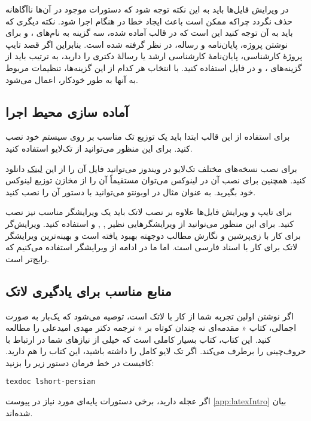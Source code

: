 در ویرایش فایل‌ها باید به این نکته توجه شود که دستورات موجود در آن‌ها ناآگاهانه حذف نگردد چراکه ممکن است باعث ایجاد خطا در هنگام اجرا شود.
نکته دیگری که باید به آن توجه کنید این است که در قالب آماده شده، سه گزینه به نام‌های
،
و
برای نوشتن پروژه، پایان‌نامه و رساله، در نظر گرفته شده است. بنابراین اگر قصد تایپ پروژهٔ کارشناسی، پایان‌نامهٔ کارشناسی ارشد یا رسالهٔ دکتری را دارید، به ترتیب باید از گزینه‌های
،
و
در فایل 
استفاده کنید. با انتخاب هر کدام از این گزینه‌ها، تنظیمات مربوط به آنها به طور خودکار، اعمال می‌شود.
 
\subsection{آماده سازی محیط اجرا}
برای استفاده از این قالب ابتدا باید یک توزیع تک مناسب بر روی سیستم خود نصب کنید. برای این منظور می‌توانید از تک‌لایو
استفاده کنید.

برای نصب نسخه‌های مختلف تک‌لایو در ویندوز می‌توانید فایل 
آن را از این
 \href{https://ftp.math.utah.edu/pub/tex/historic/systems/texlive/}{لینک}%
دانلود کنید.
همچنین برای نصب آن در لینوکس می‌توان مستقیماً آن را از مخازن توزیع لینوکس خود بگیرید. به عنوان مثال در اوبونتو می‌توانید با دستور
آن را نصب کنید.

برای تایپ و ویرایش فایل‌ها علاوه بر نصب لاتک باید یک ویرایشگر مناسب نیز نصب کتید. برای این منظور می‌نوانید از ویرایشگرهایی نظیر
,
,
و
استفاده کنید. ویرایش‌گر 
 \href{https://bitbucket.org/srazi/biditexmaker3}{}%
برای کار با زی‌پرشین و نگارش مطالب دوجهته بهبود یافته است و بهینه‌ترین ویرایشگر لاتک برای کار با اسناد فارسی است. اما ما در ادامه از ویرایشگر 
استفاده می‌کنیم که رایج‌تر است.

\subsection{منابع مناسب برای یادگیری لاتک}
اگر نوشتن \پ اولین تجربه شما از کار با لاتک است، توصیه می‌شود که یک‌بار به صورت اجمالی، کتاب «%
مقدمه‌ای نه چندان کوتاه بر
\lr{\LaTeXe}%
»
ترجمه دکتر مهدی امیدعلی را مطالعه کنید. این کتاب، کتاب بسیار کاملی است که خیلی از نیازهای شما در ارتباط با حروف‌چینی را برطرف می‌کند.
اگر تک لایو کامل را داشته باشید، این کتاب را هم دارید. کافیست در خط فرمان دستور زیر را بزنید:
\begin{latin}
	\texttt{texdoc lshort-persian}
\end{latin}
اگر عجله دارید، برخی دستورات پایه‌ای مورد نیاز در پیوست \ref{app:latexIntro} بیان شده‌اند.


